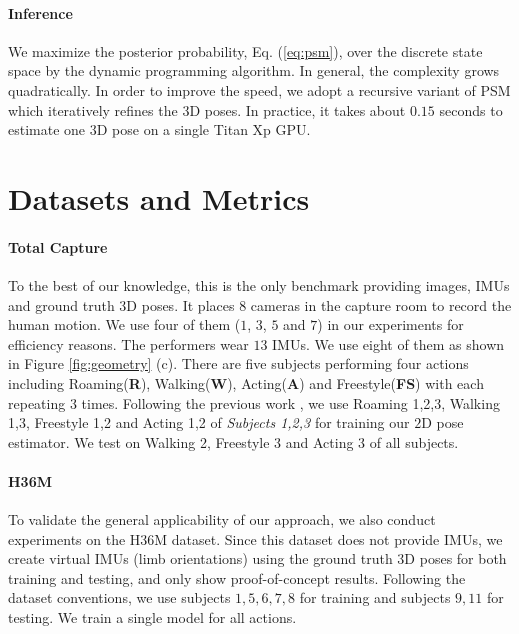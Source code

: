 \documentclass[10pt,twocolumn,letterpaper]{article}
\begin{document}
\paragraph{Inference}
We maximize the posterior probability, \ie Eq. (\ref{eq:psm}), over the discrete state space by the dynamic programming algorithm. In general, the complexity grows quadratically. In order to improve the speed, we adopt a recursive variant of PSM \cite{qiu2019cross} which iteratively refines the $3$D poses. In practice, it takes about $0.15$ seconds to estimate one $3$D pose on a single Titan Xp GPU.


\section{Datasets and Metrics}
\paragraph{Total Capture \cite{trumble2017total}} To the best of our knowledge, this is the only benchmark providing images, IMUs and ground truth $3$D poses. It places $8$ cameras in the capture room to record the human motion. We use four of them ($1$, $3$, $5$ and $7$) in our experiments for efficiency reasons. The performers wear $13$ IMUs. We use eight of them as shown in Figure \ref{fig:geometry} (c). There are five subjects performing four actions including Roaming(\textbf{R}), Walking(\textbf{W}), Acting(\textbf{A}) and Freestyle(\textbf{FS}) with each repeating $3$ times. Following the previous work \cite{trumble2017total}, we use Roaming 1,2,3, Walking 1,3, Freestyle 1,2 and Acting 1,2 of \emph{Subjects 1,2,3} for training our $2$D pose estimator. We test on Walking 2, Freestyle 3 and Acting 3 of all subjects. 



\paragraph{H36M \cite{ionescu2014human3}}
To validate the general applicability of our approach, we also conduct experiments on the H36M dataset. Since this dataset does not provide IMUs, we create virtual IMUs (limb orientations) using the ground truth $3$D poses for both training and testing, and only show proof-of-concept results. Following the dataset conventions, we use subjects $1,5,6,7,8$ for training and subjects $9,11$ for testing. We train a single model for all actions.
\end{document}
